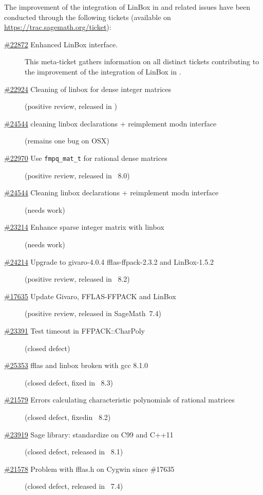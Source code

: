 \documentclass{deliverablereport}
\begin{document}
The improvement of the integration of LinBox in \Sage and related issues have
been conducted through the following tickets (available on \url{https://trac.sagemath.org/ticket}):
{\small
  \begin{description}
\item[\href{https://trac.sagemath.org/ticket/22872}{\#22872}
  Enhanced LinBox interface.]
  This meta-ticket gathers information on all distinct tickets contributing to
  the improvement of the integration of LinBox in \Sage. 
\item[\href{https://trac.sagemath.org/ticket/22924}{\#22924}
  Cleaning of linbox for dense integer matrices] (positive review, released in )
\item[\href{https://trac.sagemath.org/ticket/24544}{\#24544}
  cleaning linbox declarations + reimplement modn interface]
  (remains one bug on OSX)
\item[\href{https://trac.sagemath.org/ticket/22970}{\#22970}
  Use \texttt{fmpq\_mat\_t} for rational dense matrices]
  (positive review, released in \Sage~8.0)
\item[\href{https://trac.sagemath.org/ticket/24544}{\#24544}
  Cleaning linbox declarations + reimplement modn interface]
  (needs work)
\item[\href{https://trac.sagemath.org/ticket/23214}{\#23214}
  Enhance sparse integer matrix with linbox]
  (needs work)
\item[\href{https://trac.sagemath.org/ticket/24214}{\#24214}
  Upgrade to givaro-4.0.4 fflas-ffpack-2.3.2 and LinBox-1.5.2]
  (positive review, released in \Sage~8.2)
\item[\href{https://trac.sagemath.org/ticket/17635}{\#17635}
  	Update Givaro, FFLAS-FFPACK and LinBox]
  (positive review, released in Sage\-Math~7.4)
\item[\href{https://trac.sagemath.org/ticket/23391}{\#23391}
 Test timeout in FFPACK::CharPoly]
  (closed defect)
\item[\href{https://trac.sagemath.org/ticket/25353}{\#25353}
   fflas and linbox broken with gcc 8.1.0]
   (closed defect, fixed in \Sage~8.3)
\item[\href{https://trac.sagemath.org/ticket/21579}{\#21579}
  Errors calculating characteristic polynomials of rational matrices]
  (closed defect, fixedin \Sage~8.2)
\item[\href{https://trac.sagemath.org/ticket/23919}{\#23919}
  Sage library: standardize on C99 and C++11]
   (closed defect, released in \Sage~8.1)
\item[\href{https://trac.sagemath.org/ticket/21578}{\#21578}
  Problem with fflas.h on Cygwin since \#17635]
  (closed defect, released in \Sage~7.4)
  \end{description}
}
\end{document}
